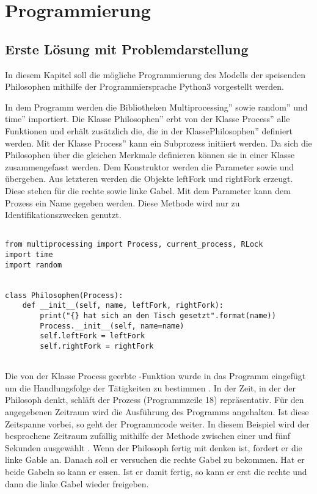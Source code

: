 \chapter{Programmierung}
\label{programmierung}
\section{Erste Lösung mit Problemdarstellung}
\label{erste_lösung}

In diesem Kapitel soll die mögliche Programmierung des Modells der speisenden Philosophen mithilfe der Programmiersprache Python3 vorgestellt werden.

In dem Programm werden die Bibliotheken \glqq Multiprocessing'' sowie \glqq random'' und \glqq time'' importiert. Die Klasse \glqq Philosophen'' erbt von der Klasse \glqq Process'' alle Funktionen und erhält zusätzlich die, die in der Klasse\glqq Philosophen'' definiert werden. Mit der Klasse \glqq Process'' kann ein Subprozess initiiert werden. Da sich die Philosophen über die gleichen Merkmale definieren können sie in einer Klasse zusammengefasst werden. Dem Konstruktor werden die Parameter  sowie  und   übergeben. Aus letzteren werden die Objekte leftFork und rightFork erzeugt. Diese stehen für die rechte sowie linke Gabel. Mit dem Parameter  kann dem Prozess ein Name gegeben werden. \glqq Diese Methode wird nur zu Identifikationszwecken genutzt\grqq \parencite{lock}.

\begin{lstlisting}[style = Python, label = {erste Lösung}, caption = {Klasse Philosophen}]

from multiprocessing import Process, current_process, RLock
import time
import random


class Philosophen(Process):
    def __init__(self, name, leftFork, rightFork):
        print("{} hat sich an den Tisch gesetzt".format(name))
        Process.__init__(self, name=name)
        self.leftFork = leftFork
        self.rightFork = rightFork
        
\end{lstlisting}

Die von der Klasse \glqq Process \grqq geerbte  -Funktion wurde in das Programm eingefügt um die Handlungsfolge der Tätigkeiten zu bestimmen \parencite[vgl.]{lock} . In der Zeit, in der der Philosoph denkt, schläft der Prozess (Programmzeile 18) repräsentativ. Für den angegebenen Zeitraum wird die Ausführung des Programms angehalten. Ist diese Zeitspanne vorbei, so geht der Programmcode weiter. In diesem Beispiel wird der besprochene Zeitraum zufällig mithilfe der  Methode zwischen einer und fünf Sekunden ausgewählt \parencite[vgl.]{sleep}. Wenn der Philosoph fertig mit denken ist, fordert er die linke Gable an. Danach soll er versuchen die rechte Gabel zu bekommen. Hat er beide Gabeln so kann er essen. Ist er damit fertig, so kann er erst die rechte und dann die linke Gabel wieder freigeben.

